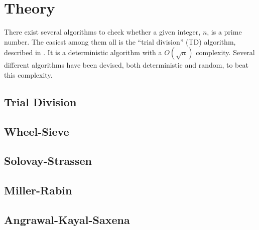 \section{Theory}
There exist several algorithms to check whether a given integer, $n$, is a prime number.
The easiest among them all is the ``trial division'' (TD) algorithm, described in .
It is a deterministic algorithm with a $O(\sqrt{n})$ complexity.
Several different algorithms have been devised, both deterministic and random, to beat this complexity.

\subsection{Trial Division} \label{sec:TD_theory}


\subsection{Wheel-Sieve} \label{sec:WS_theory}


\subsection{Solovay-Strassen} \label{sec:SS_theory}


\subsection{Miller-Rabin} \label{sec:MR_theory}


\subsection{Angrawal-Kayal-Saxena} \label{sec:AKS_theory}



